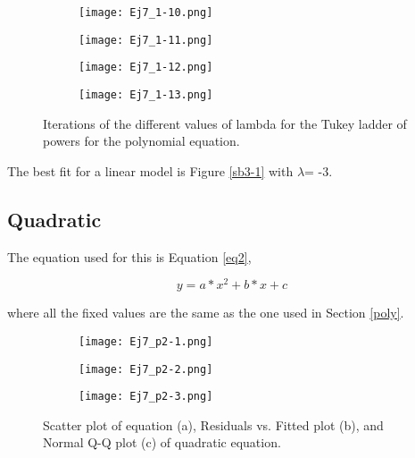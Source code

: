 \documentclass{article}
\begin{document}
\begin{figure}[]
\begin{subfigure}{.23\textwidth}
  \centering
  \texttt{[image: Ej7\_1-10.png]}  
  \caption{ }
  \label{sb3-10}
\end{subfigure}
\begin{subfigure}{.23\textwidth}
  \centering
  \texttt{[image: Ej7\_1-11.png]}  
  \caption{ }
  \label{sb3-11}
\end{subfigure}
\begin{subfigure}{.23\textwidth}
  \centering
  \texttt{[image: Ej7\_1-12.png]}  
  \caption{ }
  \label{sb3-12}
\end{subfigure}
\newline
\begin{subfigure}{1\textwidth}
  \centering
  \texttt{[image: Ej7\_1-13.png]}  
  \caption{ }
  \label{sb3-13}
\end{subfigure}
\caption{Iterations of the different values of lambda for the Tukey ladder of powers for the polynomial equation.}
\label{fig3}
\end{figure}

The best fit for a linear model is Figure \ref{sb3-1} with $\lambda$= -3.\\

\clearpage


\subsection{Quadratic}

The equation used for this is Equation \ref{eq2}, 

\begin{equation} \label{eq2}
y =  a*x^2 + b*x + c 
\end{equation}

where all the fixed values are the same as the one used in Section \ref{poly}.\\

\begin{figure}[]
\begin{subfigure}{.3\textwidth}
  \centering
  \texttt{[image: Ej7\_p2-1.png]}  
  \caption{ }
  \label{sb4-1}
\end{subfigure}
\begin{subfigure}{.3\textwidth}
  \centering
  \texttt{[image: Ej7\_p2-2.png]}  
  \caption{ }
  \label{sb4-2}
\end{subfigure}
\begin{subfigure}{.3\textwidth}
  \centering
  \texttt{[image: Ej7\_p2-3.png]}  
  \caption{ }
  \label{sb4-3}
\end{subfigure}
\caption{Scatter plot of equation (a), Residuals vs. Fitted plot (b), and Normal Q-Q plot (c) of quadratic equation.}
\label{fig4}
\end{figure}
\end{document}
